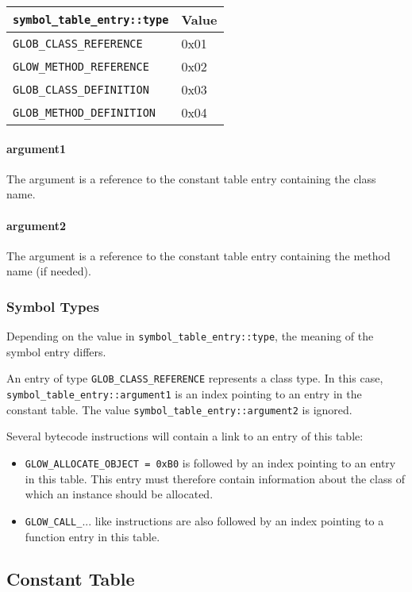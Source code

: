 \documentclass[12pt]{article}
\begin{document}
\begin{tabular}{| l | l |}
\hline
\verb|symbol_table_entry::type| & Value \\
\hline \hline
\verb|GLOB_CLASS_REFERENCE| & 0x01 \\
\hline
\verb|GLOW_METHOD_REFERENCE| & 0x02 \\
\hline
\verb|GLOB_CLASS_DEFINITION| & 0x03 \\
\hline
\verb|GLOB_METHOD_DEFINITION| & 0x04 \\
\hline
\end{tabular}

\paragraph{argument1}
    The argument is a reference to the constant table entry containing the class name.

\paragraph{argument2}
    The argument is a reference to the constant table entry containing the method name (if needed).


\subsubsection*{Symbol Types}
Depending on the value in \verb|symbol_table_entry::type|, the meaning of the symbol entry
differs.

An entry of type \verb|GLOB_CLASS_REFERENCE| represents a class type. In this case,
\verb|symbol_table_entry::argument1| is an index pointing to an entry in the constant table.
The value \verb|symbol_table_entry::argument2| is ignored.



Several bytecode instructions will contain a link to an entry of this table:

\begin{itemize}
\item \verb|GLOW_ALLOCATE_OBJECT = 0xB0| is followed by an index pointing to an entry in this
    table. This entry must therefore contain information about the class of which an instance
    should be allocated.
\item \verb|GLOW_CALL_|... like instructions are also followed by an index pointing to a function
    entry in this table.
\end{itemize}

\subsection*{Constant Table}
\end{document}

